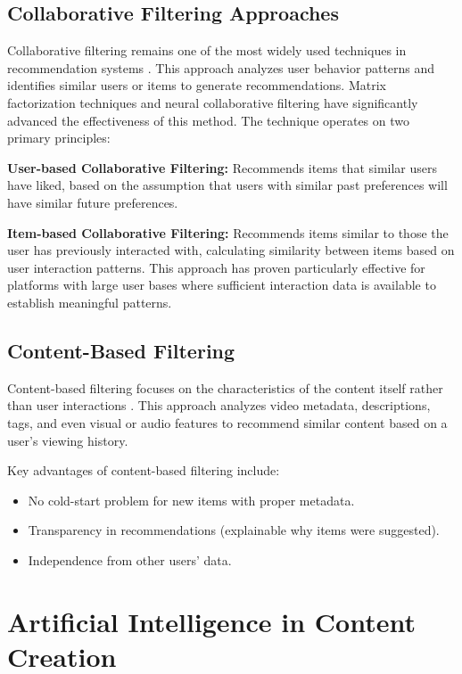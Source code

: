 \subsection{Collaborative Filtering Approaches}

Collaborative filtering remains one of the most widely used techniques in recommendation systems \cite{chowdhury2024ai, koren2009matrix}. This approach analyzes user behavior patterns and identifies similar users or items to generate recommendations. Matrix factorization techniques \cite{koren2009matrix} and neural collaborative filtering \cite{he2017neural} have significantly advanced the effectiveness of this method. The technique operates on two primary principles:

\textbf{User-based Collaborative Filtering:} Recommends items that similar users have liked, based on the assumption that users with similar past preferences will have similar future preferences.

\textbf{Item-based Collaborative Filtering:} Recommends items similar to those the user has previously interacted with, calculating similarity between items based on user interaction patterns. This approach has proven particularly effective for platforms with large user bases where sufficient interaction data is available to establish meaningful patterns.

\subsection{Content-Based Filtering}

Content-based filtering focuses on the characteristics of the content itself rather than user interactions \cite{ingrade2025youtube, chowdhury2024ai}. This approach analyzes video metadata, descriptions, tags, and even visual or audio features to recommend similar content based on a user's viewing history.

Key advantages of content-based filtering include:
\begin{itemize}[leftmargin=2cm]
  \item No cold-start problem for new items with proper metadata.
  \item Transparency in recommendations (explainable why items were suggested).
  \item Independence from other users' data.
\end{itemize}

\section{Artificial Intelligence in Content Creation}


